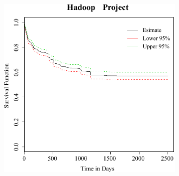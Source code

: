 \begin{figure}[t]
\begin{subfigure}[b]{0.31\textwidth}
	\end{subfigure}
	~
	~
	\begin{subfigure}[b]{0.31\textwidth}
		\includegraphics[width=\textwidth]{sur_hadoop.pdf}
	\end{subfigure}
	

\end{figure}
